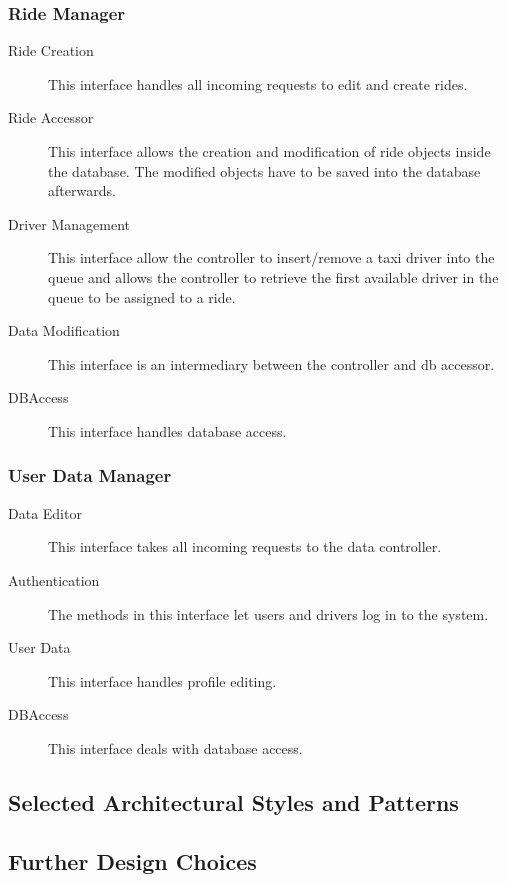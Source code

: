 	\subsubsection{Ride Manager}
		\begin{description}
			\item[Ride Creation]
				This interface handles all incoming requests to edit and create rides.
			\item[Ride Accessor]
				This interface allows the creation and modification of ride objects inside the database. The modified objects have to be saved into the database afterwards.
			\item[Driver Management]
				This interface allow the controller to insert/remove a taxi driver into the queue and allows the controller to retrieve the first available driver in the queue to be assigned to
				a ride.
			\item[Data Modification]
				This interface is an intermediary between the controller and db accessor.
			\item[DBAccess]
				This interface handles database access.
		\end{description}
	\subsubsection{User Data Manager}
		\begin{description}
			\item[Data Editor]
				This interface takes all incoming requests to the data controller.
			\item[Authentication]
				The methods in this interface let users and drivers log in to the system.
			\item[User Data]
				This interface handles profile editing.
			\item[DBAccess]
				This interface deals with database access.
		\end{description}
\subsection{Selected Architectural Styles and Patterns}

\subsection{Further Design Choices}
